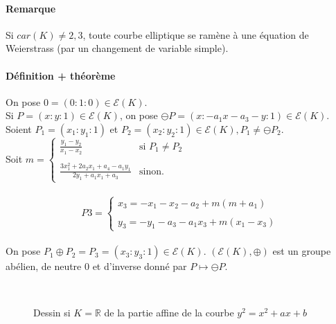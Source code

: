 \documentclass[12pt,a4paper]{report}
\begin{document}
\paragraph{Remarque\\}
Si $car(K)\neq 2,3$, toute courbe elliptique se ramène  à une équation de Weierstrass (par un changement de variable simple).
\paragraph{Définition + théorème\\}
On pose $0=(0:1:0) \in \mathcal{E}(K)$. \\
Si $P=(x:y:1)\in \mathcal{E}(K)$, on pose $\ominus P = (x:-a_1x-a_3-y:1)\in \mathcal{E}(K)$.\\
Soient $P_1=(x_1:y_1:1)$ et $P_2=(x_2:y_2:1) \in \mathcal{E}(K), P_1 \neq \ominus P_2$.\\
Soit $ m =  \left\{
    \begin{array}{ll}
        \displaystyle \frac{y_1-y_2}{x_1-x_2} & \mbox{si } P_1 \neq P_2 \\
        \\
        \displaystyle \frac{3x_1^2+2a_2x_1+a_4-a_1y_1}{2y_1+a_1x_1+a_3} & \mbox{sinon.}
    \end{array}
\right.$ \\ \\
$$P3= \left\{
	\begin{array}{l}
        \displaystyle  x_3=-x_1-x_2-a_2+m(m+a_1)\\
        \\
        \displaystyle y_3=-y_1-a_3-a_1x_3+m(x_1-x_3) 
    \end{array}
\right.$$\\
On pose $P_1 \oplus P_2 =P_3 = (x_3:y_3:1) \in \mathcal{E}(K) $. $(\mathcal{E}(K) ,\oplus)$ est un groupe abélien, de neutre 0 et d'inverse donné par $P \longmapsto \ominus P $.
\begin{figure}[htp]
  \centering
  \caption{Dessin si $K=\mathbb{R}$ de la partie affine de la courbe $y^2=x^2+ax+b$}
   \\
\end{figure}
\end{document}
